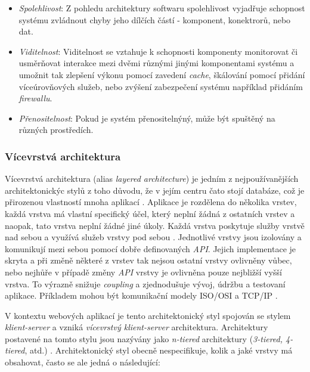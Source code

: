 \begin{itemize}
  \item{\textit{Spolehlivost}}: Z pohledu architektury softwaru spolehlivost vyjadřuje schopnost systému zvládnout chyby jeho dílčích částí - komponent, konektrorů, nebo dat.
  \item{\textit{Viditelnost}}: Viditelnost se vztahuje k schopnosti komponenty monitorovat či usměrňovat interakce mezi dvěmi různými jinými komponentami systému a umožnit tak zlepšení výkonu pomocí zavedení \textit{cache}, škálování pomocí přidání víceúrovňových služeb, nebo zvýšení zabezpečení systému například přidáním \textit{firewallu}.
  \item{\textit{Přenositelnost}}: Pokud je systém přenositelnýný, může být spuštěný na různých prostředích.
\end{itemize}

\subsubsection{Vícevrstvá architektura}
\label{sec:n-tier}
Vícevrstvá architektura (alias \textit{layered architecture}) je jedním z nejpoužívanějších architektonickýc stylů z toho důvodu, že v jejím centru čato stojí databáze, což je přirozenou vlastností mnoha aplikací \cite{Richards15}. Aplikace je rozdělena do několika vrstev, každá vrstva má vlastní specifický účel, který neplní žádná z ostatních vrstev a naopak, tato vrstva neplní žádné jiné úkoly. Každá vrstva poskytuje služby vrstvě nad sebou a využívá služeb vrstvy pod sebou \cite{Garlan94}. Jednotlivé vrstvy jsou izolovány a komunikují mezi sebou pomocí dobře definovaných \textit{API}. Jejich implementace je skryta a při změně některé z vrstev tak nejsou ostatní vrstvy ovlivněny vůbec, nebo nejhůře v případě změny \textit{API} vrstvy je ovlivněna pouze nejbližší vyšší vrstva. To výrazně snižuje \textit{coupling} a zjednodušuje vývoj, údržbu a testovaní aplikace. Příkladem mohou být komunikační modely ISO/OSI a TCP/IP \cite{Zimmerman80}.

V kontextu webových aplikací je tento architektonický styl spojován se stylem \textit{klient-server} a vzniká \textit{vícevrstvý klient-server} architektura. Architektury postavené na tomto stylu jsou nazývány jako \textit{n-tiered} architektury (\textit{3-tiered, 4-tiered}, atd.) \cite{Umar97}. Architektonický styl obecně nespecifikuje, kolik a jaké vrstvy má obsahovat, často se ale jedná o následující:

